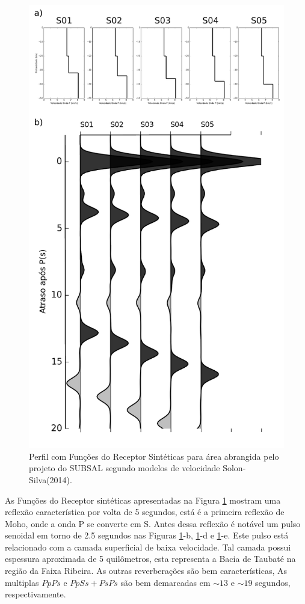 \begin{figure}[!ht]
\centering
\includegraphics[scale=0.25]{perfil_RF_sintetico.png}
\caption{Perfil com Funções do Receptor Sintéticas para área abrangida pelo projeto do SUBSAL segundo modelos de velocidade Solon-Silva(2014).}
\label{modelagem}
\end{figure}

As Funções do Receptor sintéticas apresentadas na Figura \ref{modelagem} mostram uma reflexão característica por volta de 5 segundos, está é a primeira reflexão de Moho, onde a onda P se converte em S. Antes dessa reflexão é notável um pulso senoidal em torno de 2.5 segundos nas Figuras \ref{modelagem}-b, \ref{modelagem}-d e \ref{modelagem}-e. Este pulso está relacionado com a camada superficial de baixa velocidade. Tal camada possui espessura aproximada de 5 quilômetros, esta representa a Bacia de Taubaté na região da Faixa Ribeira. As outras reverberações são bem características, As multiplas $PpPs$ e $PpSs+PsPs$ são bem demarcadas em $\sim 13$ e $\sim 19$ segundos, respectivamente.